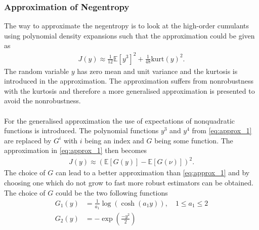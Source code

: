 \subsubsection{Approximation of Negentropy}
The way to approximate the negentropy is to look at the high-order cumulants using polynomial density expansions such that the approximation could be given as
\begin{align}\label{eq:approx_1}
J(y) \approx \frac{1}{12} \mathbb{E}[y^3]^2 + \frac{1}{48} \text{kurt}(y)^2.
\end{align}
The random variable $y$ has zero mean and unit variance and the kurtosis is introduced in the approximation. The approximation suffers from nonrobustness with the kurtosis and therefore a more generalised approximation is presented to avoid the nonrobustness.
\\ \\
For the generalised approximation the use of expectations of nonquadratic functions is introduced. The polynomial functions $y^3$ and $y^4$ from \eqref{eq:approx_1} are replaced by $G^i$ with $i$ being an index and $G$ being some function. The approximation in \eqref{eq:approx_1} then becomes
\begin{align*}
J(y) \approx (\mathbb{E}[G(y)] - \mathbb{E}[G(\nu)])^2.
\end{align*}
The choice of $G$ can lead to a better approximation than \eqref{eq:approx_1} and by choosing one which do not grow to fast more robust estimators can be obtained. The choice of $G$ could be the two following functions
\begin{align*}
G_1 (y) &= \frac{1}{a_1} \log (\cosh(a_1 y)), \quad 1 \leq a_1 \leq 2 \\
G_2 (y) &= -\exp \left( \frac{-y^2}{2} \right)
\end{align*}


